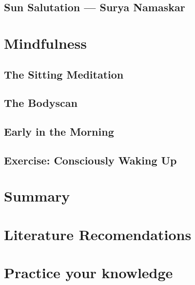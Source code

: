 \documentclass[../main.tex]{subfiles}
\begin{document}
\newpage
\section{Sun Salutation ---  Surya Namaskar}

\chapter{Mindfulness}
\section{The Sitting Meditation} %


\section{The Bodyscan}



\section{Early in the Morning}



\newpage
\section{Exercise: Consciously Waking Up}



\newpage



\chapter{Summary}

\chapter{Literature Recomendations}


\chapter{Practice your knowledge}

\end{document}
